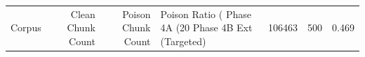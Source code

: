 \begin{tabular}{lrrll}
\toprule
Corpus & Clean Chunk Count & Poison Chunk Count & Poison Ratio (%
\midrule
Phase 4A (20%
Phase 4B Ext (Targeted) & 106463 & 500 & 0.469%
\bottomrule
\end{tabular}
